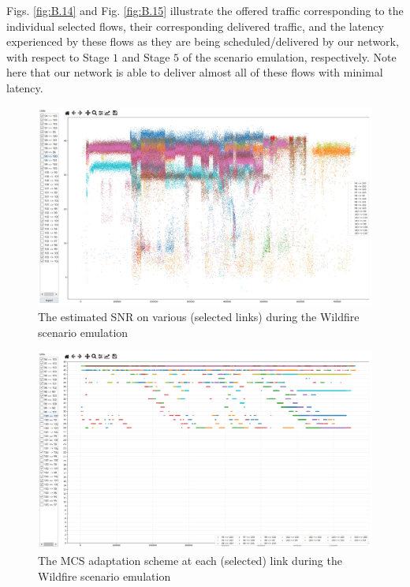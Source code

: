 Figs. \ref{fig:B.14} and Fig. \ref{fig:B.15} illustrate the offered traffic corresponding to the individual selected flows, their corresponding delivered traffic, and the latency experienced by these flows as they are being scheduled/delivered by our network, with respect to Stage $1$ and Stage $5$ of the scenario emulation, respectively. Note here that our network is able to deliver almost all of these flows with minimal latency.
\begin{figure} [htb]
    \centerline{
    \includegraphics[width = 1.0\textwidth]{Wildfire_SNR.PNG}}
    \caption{The estimated SNR on various (selected links) during the Wildfire scenario emulation}
    \label{fig:B.16}
\end{figure}
\begin{figure} [htb]
    \centerline{
    \includegraphics[width = 1.0\textwidth]{Wildfire_MCS.PNG}}
    \caption{The MCS adaptation scheme at each (selected) link during the Wildfire scenario emulation}
    \label{fig:B.17}
\end{figure}

